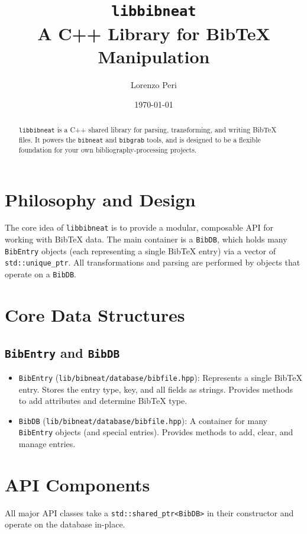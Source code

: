\documentclass[11pt]{article}
\title{\texttt{libbibneat} \\ \large A C++ Library for BibTeX Manipulation}
\author{Lorenzo Peri}
\date{\today}
\begin{document}
\maketitle

\begin{abstract}
\texttt{libbibneat} is a C++ shared library for parsing, transforming, and writing BibTeX files. It powers the \texttt{bibneat} and \texttt{bibgrab} tools, and is designed to be a flexible foundation for your own bibliography-processing projects.
\end{abstract}

\section{Philosophy and Design}
The core idea of \texttt{libbibneat} is to provide a modular, composable API for working with BibTeX data. The main container is a \texttt{BibDB}, which holds many \texttt{BibEntry} objects (each representing a single BibTeX entry) via a vector of \texttt{std::unique\_ptr}. All transformations and parsing are performed by objects that operate on a \texttt{BibDB}.

\section{Core Data Structures}
\subsection{\texttt{BibEntry} and \texttt{BibDB}}
\begin{itemize}
  \item \texttt{BibEntry} (\texttt{lib/bibneat/database/bibfile.hpp}): Represents a single BibTeX entry. Stores the entry type, key, and all fields as strings. Provides methods to add attributes and determine BibTeX type.
  \item \texttt{BibDB} (\texttt{lib/bibneat/database/bibfile.hpp}): A container for many \texttt{BibEntry} objects (and special entries). Provides methods to add, clear, and manage entries.
\end{itemize}

\section{API Components}
All major API classes take a \texttt{std::shared\_ptr<BibDB>} in their constructor and operate on the database in-place.
\end{document}
